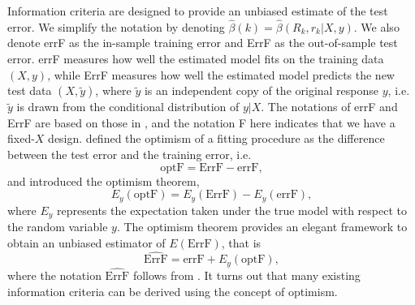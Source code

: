 Information criteria are designed to provide an unbiased estimate of the test error. We simplify the notation by denoting $\hat\beta(k) = \hat{\beta}(R_k,r_k|X,y)$. We also denote errF as the in-sample training error and ErrF as the out-of-sample test error. errF measures how well the estimated model fits on the training data $(X,y)$, while ErrF measures how well the estimated model predicts the new test data $(X,\tilde{y})$, where $\tilde{y}$ is an independent copy of the original response $y$, i.e. $\tilde{y}$ is drawn from the conditional distribution of $y|X$. The notations of errF and ErrF are based on those in \citet{efron2004estimation}, and the notation F here indicates that we have a fixed-$X$ design. \citet{efron1986biased} defined the optimism of a fitting procedure as the difference between the test error and the training error, i.e.
\begin{equation*}
\text{optF} = \text{ErrF} - \text{errF},
\end{equation*}
and introduced the optimism theorem,
\begin{equation*}
E_y(\text{optF}) = E_y(\text{ErrF}) - E_y(\text{errF}),
\end{equation*}
where $E_y$ represents the expectation taken under the true model with respect to the random variable $y$. The optimism theorem provides an elegant framework to obtain an unbiased estimator of $E(\text{ErrF})$, 
that is
\begin{equation*}
\widehat{\text{ErrF}} = \text{errF} + E_y(\text{optF}),
\end{equation*}
where the notation $\widehat{\text{ErrF}}$ follows from \citet{efron2004estimation}. It turns out that many existing information criteria can be derived using the concept of optimism. 

